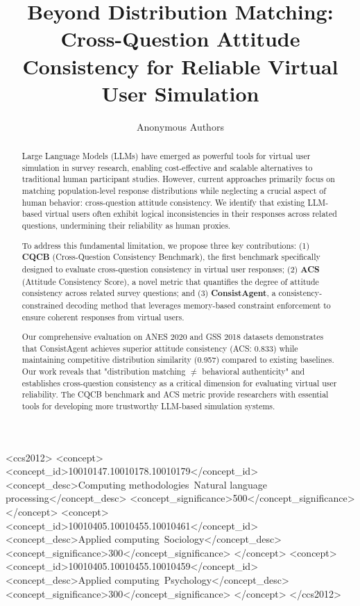 \documentclass[sigconf, anonymous]{acmart}
\begin{document}
\title{Beyond Distribution Matching: Cross-Question Attitude Consistency for Reliable Virtual User Simulation}

\author{Anonymous Authors}

\begin{abstract}
Large Language Models (LLMs) have emerged as powerful tools for virtual user simulation in survey research, enabling cost-effective and scalable alternatives to traditional human participant studies. However, current approaches primarily focus on matching population-level response distributions while neglecting a crucial aspect of human behavior: cross-question attitude consistency. We identify that existing LLM-based virtual users often exhibit logical inconsistencies in their responses across related questions, undermining their reliability as human proxies.

To address this fundamental limitation, we propose three key contributions: (1) \textbf{CQCB} (Cross-Question Consistency Benchmark), the first benchmark specifically designed to evaluate cross-question consistency in virtual user responses; (2) \textbf{ACS} (Attitude Consistency Score), a novel metric that quantifies the degree of attitude consistency across related survey questions; and (3) \textbf{ConsistAgent}, a consistency-constrained decoding method that leverages memory-based constraint enforcement to ensure coherent responses from virtual users.

Our comprehensive evaluation on ANES 2020 and GSS 2018 datasets demonstrates that ConsistAgent achieves superior attitude consistency (ACS: 0.833) while maintaining competitive distribution similarity (0.957) compared to existing baselines. Our work reveals that "distribution matching $\neq$ behavioral authenticity" and establishes cross-question consistency as a critical dimension for evaluating virtual user reliability. The CQCB benchmark and ACS metric provide researchers with essential tools for developing more trustworthy LLM-based simulation systems.
\end{abstract}


\begin{CCSXML}
<ccs2012>
<concept>
<concept_id>10010147.10010178.10010179</concept_id>
<concept_desc>Computing methodologies~Natural language processing</concept_desc>
<concept_significance>500</concept_significance>
</concept>
<concept>
<concept_id>10010405.10010455.10010461</concept_id>
<concept_desc>Applied computing~Sociology</concept_desc>
<concept_significance>300</concept_significance>
</concept>
<concept>
<concept_id>10010405.10010455.10010459</concept_id>
<concept_desc>Applied computing~Psychology</concept_desc>
<concept_significance>300</concept_significance>
</concept>
</ccs2012>
\end{CCSXML}
\end{document}
